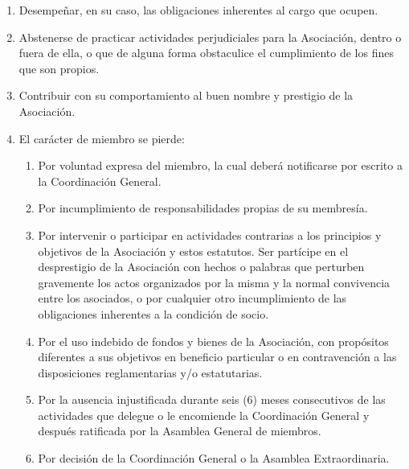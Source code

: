 \begin{enumerate}
          \item
            Desempe\~nar, en su caso, las obligaciones inherentes al cargo que
            ocupen.

          \item
            Abstenerse de practicar actividades perjudiciales para la
            Asociaci\'on, dentro o fuera de ella, o que de alguna forma
            obstaculice el cumplimiento de los fines que son propios.

          \item 
            Contribuir con su comportamiento al buen nombre y prestigio de la
            Asociaci\'on.

          \item 
            El car\'acter de miembro se pierde:

            \begin{enumerate}

              \item 
                Por voluntad expresa del miembro, la cual deber\'a notificarse
                por escrito a la Coordinaci\'on General.
              
              \item 
                Por incumplimiento de responsabilidades propias de su
                membres\'ia. \item \label{enum:traidor} Por intervenir o
                participar en actividades contrarias a los principios y
                objetivos de la Asociaci\'on y estos estatutos. Ser
                part\'i{}cipe en el desprestigio de la Asociaci\'on con hechos o
                palabras que perturben gravemente los actos organizados por la
                misma y la normal convivencia entre los asociados, o por
                cualquier otro incumplimiento de las obligaciones inherentes a
                la condici\'on de socio.

              \item
                \label{enum:ladron} Por el uso indebido de fondos y bienes de la
                Asociaci\'on, con prop\'ositos diferentes a sus objetivos en
                beneficio particular o en contravenci\'on a las disposiciones
                reglamentarias y/o estatutarias.
              
              \item 
                Por la ausencia injustificada durante seis (6) meses
                consecutivos de las actividades que delegue o le encomiende la
                Coordinaci\'on General y despu\'es ratificada por la Asamblea
                General de miembros.
                
              \item 
                Por decisi\'on de la Coordinaci\'on General o la Asamblea
                Extraordinaria.

            \end{enumerate}
      
        \end{enumerate}
        
